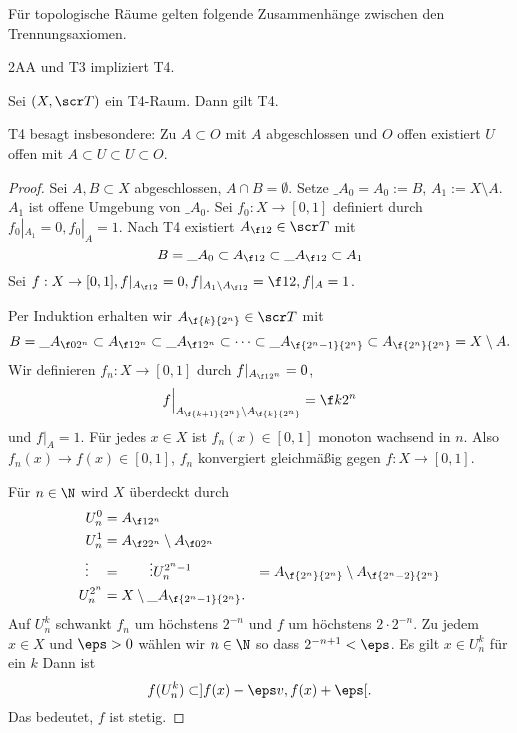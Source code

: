 Für topologische Räume gelten folgende Zusammenhänge zwischen den Trennungsaxiomen.

\begin{lem}[Tychonoff]
	2AA und T3 impliziert T4.
\end{lem}

\begin{st}[Urysohn]
	Sei $(X, \scr T)$ ein T4-Raum.
	Dann gilt T4.
	\begin{note}
		T4 besagt insbesondere:
		Zu $A \subset O$ mit $A$ abgeschlossen und $O$ offen existiert $U$ offen mit $A \subset U \subset U \subset O$.
	\end{note}
	\begin{proof}
		Sei $A, B \subset X$ abgeschlossen, $A \cap B = \emptyset$.
		Setze $\_{A_0} = A_0 := B$, $A_1 := X \setminus A$.
		$A_1$ ist offene Umgebung von $\_{A_0}$.
		Sei $f_0: X \to [0,1]$ definiert durch $f_0|_{A_1} = 0, f_0|_{A} = 1$.
		Nach T4 existiert $A_{\f 12} \in \scr T$ mit
		\[
			B = \_{A_0} \subset A_{\f 12} \subset \_{A_{\f 12}} \subset A_1
		\]
		Sei $f: X \to [0,1], f|_{A_{\f 12}} = 0, f|_{A_1 \setminus A_{\f 12}} = \f 12, f|_A = 1$.

		Per Induktion erhalten wir $A_{\f {k}{2^n}} \in \scr T$ mit
		\[
			B = \_{A_{\f 0{2^n}}} \subset A_{\f 1{2^n}} \subset \_{A_{\f 1{2^n}}}
			\subset \dotsb \subset
			\_{A_{\f{2^n - 1}{2^n}}}
			\subset A_{\f {2^n}{2^n}}
			= X \setminus A.
		\]
		Wir definieren $f_n : X \to [0,1]$ durch $f|_{A_{\f 1{2^n}}} = 0$,
		\[
			f\Big|_{A_{\f {k+1}{2^n}} \setminus A_{\f {k}{2^n}}}
			= \f k{2^n}
		\]
		und $f|_A = 1$.
		Für jedes $x \in X$ ist $f_n(x) \in [0,1]$ monoton wachsend in $n$.
		Also $f_n(x) \to f(x) \in [0,1]$, $f_n$ konvergiert gleichmäßig gegen $f: X \to [0,1]$.

		Für $n \in \N$ wird $X$ überdeckt durch
		\begin{align*}
			U_n^0 &= A_{\f 1{2^n}} \\
			U_n^1 &= A_{\f 2{2^n}} \setminus A_{\f 0{2^n}} \\
			\vdots \quad &= \qquad \vdots
			U_n^{2^n-1} &= A_{\f {2^n}{2^n}} \setminus A_{\f {2^n-2}{2^n}} \\
			U_n^{2^n} &= X \setminus \_{A_{\f {2^n-1}{2^n}}}.
		\end{align*}
		Auf $U_n^k$ schwankt $f_n$ um höchstens $2^{-n}$ und $f$ um höchstens $2\cdot 2^{-n}$.
		Zu jedem $x \in X$ und $\eps > 0$ wählen wir $n \in \N$ so dass $2^{-n+1} < \eps$.
		Es gilt $x \in U_n^k$ für ein $k$
		Dann ist
		\[
			f(U_n^k) \subset ]f(x) - \eps v, f(x) + \eps[.
		\]
		Das bedeutet, $f$ ist stetig.
	\end{proof}
\end{st}

